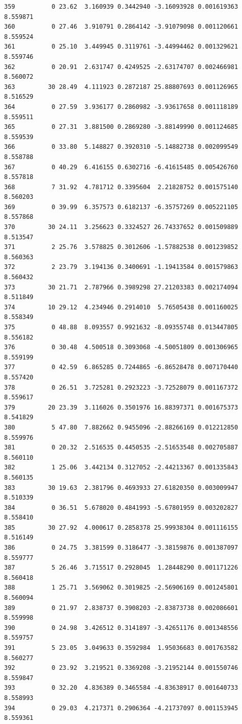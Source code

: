 \documentclass[]{book}
\theoremstyle{definition}
\theoremstyle{definition}
\theoremstyle{definition}
\theoremstyle{remark}
\begin{document}
\begin{verbatim}
359          0 23.62  3.160939 0.3442940 -3.16093928 0.001619363 8.559871
360          0 27.46  3.910791 0.2864142 -3.91079098 0.001120661 8.559524
361          0 25.10  3.449945 0.3119761 -3.44994462 0.001329621 8.559746
362          0 20.91  2.631747 0.4249525 -2.63174707 0.002466981 8.560072
363         30 28.49  4.111923 0.2872187 25.88807693 0.001126965 8.516529
364          0 27.59  3.936177 0.2860982 -3.93617658 0.001118189 8.559511
365          0 27.31  3.881500 0.2869280 -3.88149990 0.001124685 8.559539
366          0 33.80  5.148827 0.3920310 -5.14882738 0.002099549 8.558788
367          0 40.29  6.416155 0.6302716 -6.41615485 0.005426760 8.557818
368          7 31.92  4.781712 0.3395604  2.21828752 0.001575140 8.560203
369          0 39.99  6.357573 0.6182137 -6.35757269 0.005221105 8.557868
370         30 24.11  3.256623 0.3324527 26.74337652 0.001509889 8.513547
371          2 25.76  3.578825 0.3012606 -1.57882538 0.001239852 8.560363
372          2 23.79  3.194136 0.3400691 -1.19413584 0.001579863 8.560432
373         30 21.71  2.787966 0.3989298 27.21203383 0.002174094 8.511849
374         10 29.12  4.234946 0.2914010  5.76505438 0.001160025 8.558349
375          0 48.88  8.093557 0.9921632 -8.09355748 0.013447805 8.556182
376          0 30.48  4.500518 0.3093068 -4.50051809 0.001306965 8.559199
377          0 42.59  6.865285 0.7244865 -6.86528478 0.007170440 8.557420
378          0 26.51  3.725281 0.2923223 -3.72528079 0.001167372 8.559617
379         20 23.39  3.116026 0.3501976 16.88397371 0.001675373 8.541829
380          5 47.80  7.882662 0.9455096 -2.88266169 0.012212850 8.559976
381          0 20.32  2.516535 0.4450535 -2.51653548 0.002705887 8.560110
382          1 25.06  3.442134 0.3127052 -2.44213367 0.001335843 8.560135
383         30 19.63  2.381796 0.4693933 27.61820350 0.003009947 8.510339
384          0 36.51  5.678020 0.4841993 -5.67801959 0.003202827 8.558410
385         30 27.92  4.000617 0.2858378 25.99938304 0.001116155 8.516149
386          0 24.75  3.381599 0.3186477 -3.38159876 0.001387097 8.559777
387          5 26.46  3.715517 0.2928045  1.28448290 0.001171226 8.560418
388          1 25.71  3.569062 0.3019825 -2.56906169 0.001245801 8.560094
389          0 21.97  2.838737 0.3908203 -2.83873738 0.002086601 8.559998
390          0 24.98  3.426512 0.3141897 -3.42651176 0.001348556 8.559757
391          5 23.05  3.049633 0.3592984  1.95036683 0.001763582 8.560277
392          0 23.92  3.219521 0.3369208 -3.21952144 0.001550746 8.559847
393          0 32.20  4.836389 0.3465584 -4.83638917 0.001640733 8.558993
394          0 29.03  4.217371 0.2906364 -4.21737097 0.001153945 8.559361

\end{verbatim}
\end{document}
